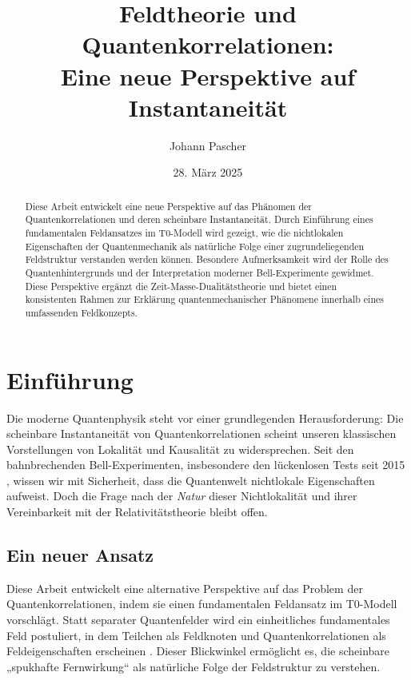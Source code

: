 \documentclass[a4paper,12pt]{article}
\title{Feldtheorie und Quantenkorrelationen: \\Eine neue Perspektive auf Instantaneität}
\author{Johann Pascher}
\date{28. März 2025}
\begin{document}
	
	\maketitle
	
	\begin{abstract}
		Diese Arbeit entwickelt eine neue Perspektive auf das Phänomen der Quantenkorrelationen und deren scheinbare Instantaneität. Durch Einführung eines fundamentalen Feldansatzes im T0-Modell wird gezeigt, wie die nichtlokalen Eigenschaften der Quantenmechanik als natürliche Folge einer zugrundeliegenden Feldstruktur verstanden werden können. Besondere Aufmerksamkeit wird der Rolle des Quantenhintergrunds und der Interpretation moderner Bell-Experimente gewidmet. Diese Perspektive ergänzt die Zeit-Masse-Dualitätstheorie und bietet einen konsistenten Rahmen zur Erklärung quantenmechanischer Phänomene innerhalb eines umfassenden Feldkonzepts.
	\end{abstract}
	
	\tableofcontents
	\newpage
	
	\section{Einführung}
	Die moderne Quantenphysik steht vor einer grundlegenden Herausforderung: Die scheinbare Instantaneität von Quantenkorrelationen scheint unseren klassischen Vorstellungen von Lokalität und Kausalität zu widersprechen. Seit den bahnbrechenden Bell-Experimenten, insbesondere den lückenlosen Tests seit 2015 \cite{Hensen2015}, wissen wir mit Sicherheit, dass die Quantenwelt nichtlokale Eigenschaften aufweist. Doch die Frage nach der \textit{Natur} dieser Nichtlokalität und ihrer Vereinbarkeit mit der Relativitätstheorie bleibt offen.
	
	\subsection{Ein neuer Ansatz}
	Diese Arbeit entwickelt eine alternative Perspektive auf das Problem der Quantenkorrelationen, indem sie einen fundamentalen Feldansatz im T0-Modell vorschlägt. Statt separater Quantenfelder wird ein einheitliches fundamentales Feld postuliert, in dem Teilchen als Feldknoten und Quantenkorrelationen als Feldeigenschaften erscheinen \cite{Wilczek2008}. Dieser Blickwinkel ermöglicht es, die scheinbare „spukhafte Fernwirkung“ als natürliche Folge der Feldstruktur zu verstehen.
	
\end{document}
